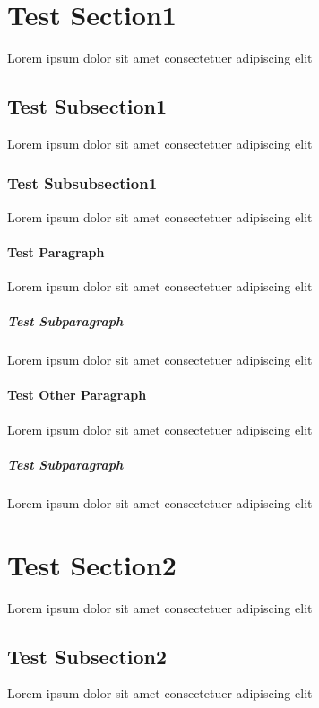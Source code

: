 \documentclass{article}
\begin{document}
\section{Test Section1}
Lorem ipsum dolor sit amet consectetuer adipiscing elit

\subsection{Test Subsection1}
Lorem ipsum dolor sit amet consectetuer adipiscing elit

\subsubsection{Test Subsubsection1}
Lorem ipsum dolor sit amet consectetuer adipiscing elit

\paragraph{Test Paragraph}
Lorem ipsum dolor sit amet consectetuer adipiscing elit

\subparagraph{Test Subparagraph} 
Lorem ipsum dolor sit amet consectetuer adipiscing elit

\paragraph{Test Other Paragraph}
Lorem ipsum dolor sit amet consectetuer adipiscing elit

\subparagraph{Test Subparagraph}

  Lorem ipsum dolor
  sit amet consectetuer adipiscing
  elit
\section{Test Section2}
Lorem ipsum dolor sit amet consectetuer adipiscing elit

\subsection{Test Subsection2}
Lorem ipsum dolor sit amet consectetuer adipiscing elit
\end{document}
